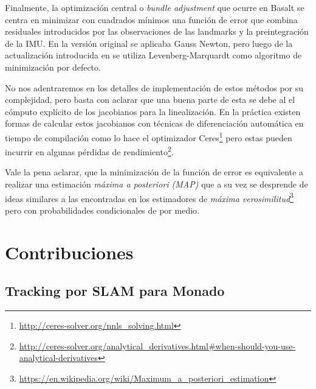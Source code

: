 \documentclass[ twoside,openright,titlepage,numbers=noenddot,%
                headinclude,footinclude,cleardoublepage=empty,abstract=on,
                BCOR=-5mm,paper=a4,fontsize=11pt
                ]{scrreprt}
\begin{document}
Finalmente, la optimización central o \emph{bundle adjustment} que
ocurre en Basalt se centra en minimizar con cuadrados mínimos una
función de error que combina residuales introducidos por las
observaciones de las landmarks y la preintegración de la IMU. En la
versión original se aplicaba Gauss Newton, pero luego de la
actualización introducida en \textcite{demmelBasaltSquareRoot2021} se
utiliza Levenberg-Marquardt como algoritmo de minimización por defecto.

No nos adentraremos en los detalles de implementación de estos métodos
por su complejidad, pero basta con aclarar que una buena parte de esta
se debe al el cómputo explícito de los jacobianos para la linealización.
En la práctica existen formas de calcular estos jacobianos con técnicas
de diferenciación automática en tiempo de compilación como lo hace el
optimizador Ceres\footnote{\url{http://ceres-solver.org/nnls_solving.html}}
pero estas pueden incurrir en algunas pérdidas de
rendimiento\footnote{\url{http://ceres-solver.org/analytical_derivatives.html\#when-should-you-use-analytical-derivatives}}.

Vale la pena aclarar, que la minimización de la función de error es
equivalente a realizar una estimación \emph{máxima a posteriori (MAP)}
\autocite{camposORBSLAM3AccurateOpenSource2021} que a su vez se
desprende de ideas similares a las encontradas en los estimadores de
\emph{máxima verosimilitud}\footnote{\url{https://en.wikipedia.org/wiki/Maximum_a_posteriori_estimation}}
pero con probabilidades condicionales de por medio.

\cleardoublepage
{}

\hypertarget{contribuciones}{%
\part{Contribuciones}\label{contribuciones}}

\hypertarget{tracking-por-slam-para-monado}{%
\chapter{Tracking por SLAM para
Monado}\label{tracking-por-slam-para-monado}}
\end{document}
